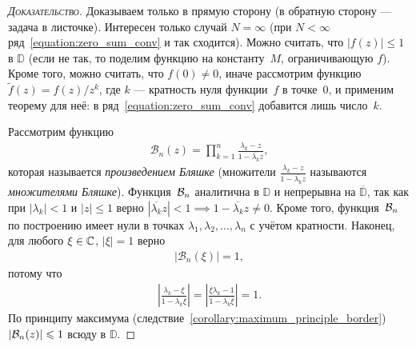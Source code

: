 \documentclass[../complex-analysis.tex]{subfiles}
\begin{document}
\begin{proof}[\normalfont\textsc{Доказательство}]
 Доказываем только в прямую сторону (в обратную сторону --- задача в листочке). Интересен только случай $ N = \infty $ (при $ N < \infty $ ряд~\eqref{equation:zero_sum_conv} и так сходится). Можно считать, что $ \left| f(z) \right| \leqslant 1$ в $ \mathbb D $ (если не так, то поделим функцию на константу~$ M $, ограничивающую $ f $). Кроме того, можно считать, что $ f(0) \neq 0 $, иначе рассмотрим функцию~$ \tilde f(z) = f(z) / z^{k} $, где $ k $ --- кратность нуля функции~$ f $ в точке~$ 0 $, и применим теорему для неё: в ряд~\eqref{equation:zero_sum_conv} добавится лишь число~$ k $.

 Рассмотрим функцию
 \begin{align*}
  \mathcal B_n(z) = \prod_{k=1}^{n} \frac{\lambda_k - z}{1 - \overline{\lambda_k}z},
 \end{align*} которая называется \textit{произведением Бляшке} (множители $ \frac{\lambda_k - z}{1 - \overline{\lambda_k} z} $ называются \emph{множителями Бляшке}). Функция~$ \mathcal{B}_n $ аналитична в $ \mathbb D $ и непрерывна на $ \overline{\mathbb D} $, так как при $ \left| \lambda_k \right| < 1 $ и $ \left| z \right| \leqslant 1 $ верно $ \left| \overline{\lambda_k} z \right| < 1 \implies 1 - \overline{\lambda_k} z \neq 0 $. Кроме того, функция~$ \mathcal{B}_n $ по построению имеет нули в точках $ \lambda_1, \lambda_2, \ldots, \lambda_n $ с учётом кратности. Наконец, для любого $ \xi \in \mathbb{C} $, $ \left| \xi \right|=1 $ верно
 \begin{align*}
  \left| \mathcal B_n(\xi) \right| = 1,
 \end{align*} потому что
 \begin{align*}
  \left| \frac{\lambda_k - \xi}{1 - \overline{\lambda_k}\xi} \right| = \left| \frac{\overline \xi \lambda_k - 1}{1 - \overline{\lambda_k} \xi} \right| = 1.
 \end{align*} По принципу максимума (следствие~\ref{corollary:maximum_principle_border}) $ \left| \mathcal{B}_n(z) \right| \leqslant 1$ всюду в $ \mathbb D $.


\end{proof}
\end{document}
